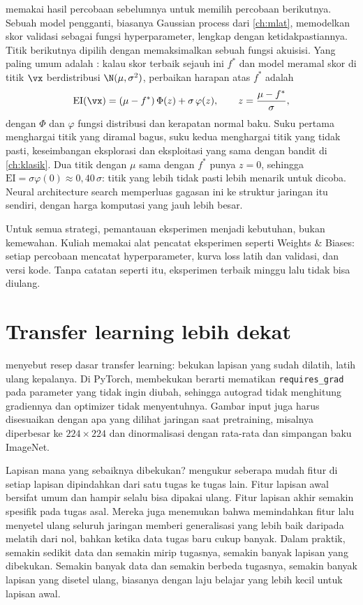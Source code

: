  \citep{snoek2012} memakai hasil percobaan sebelumnya untuk memilih percobaan berikutnya. Sebuah
model pengganti, biasanya Gaussian process dari \cref{ch:mlat}, memodelkan skor validasi sebagai fungsi hyperparameter, lengkap
dengan ketidakpastiannya. Titik berikutnya dipilih dengan memaksimalkan sebuah fungsi akuisisi. Yang paling umum adalah
: kalau skor terbaik sejauh ini $f^*$ dan model meramal skor di titik $\vx$ berdistribusi
$\N(\mu,\sigma^2)$, perbaikan harapan atas $f^*$ adalah
\begin{equation}
\mathrm{EI}(\vx)=(\mu-f^*)\,\Phi(z)+\sigma\,\varphi(z),\qquad z=\frac{\mu-f^*}{\sigma},
\end{equation}
dengan $\Phi$ dan $\varphi$ fungsi distribusi dan kerapatan normal baku. Suku pertama menghargai titik yang diramal bagus,
suku kedua menghargai titik yang tidak pasti, keseimbangan eksplorasi dan eksploitasi yang sama dengan bandit di
\cref{ch:klasik}. Dua titik dengan $\mu$ sama dengan $f^*$ punya $z=0$, sehingga $\mathrm{EI}=\sigma\varphi(0)\approx0{,}40\,\sigma$:
titik yang lebih tidak pasti lebih menarik untuk dicoba. Neural architecture search memperluas gagasan ini ke struktur
jaringan itu sendiri, dengan harga komputasi yang jauh lebih besar.

Untuk semua strategi, pemantauan eksperimen menjadi kebutuhan, bukan kemewahan. Kuliah memakai alat pencatat eksperimen
seperti Weights \& Biases: setiap percobaan mencatat hyperparameter, kurva loss latih dan validasi, dan versi kode. Tanpa catatan
seperti itu, eksperimen terbaik minggu lalu tidak bisa diulang.

\section{Transfer learning lebih dekat}

 menyebut resep dasar transfer learning: bekukan lapisan yang sudah dilatih, latih ulang kepalanya. Di
PyTorch, membekukan berarti mematikan \texttt{requires\_grad} pada parameter yang tidak ingin diubah, sehingga autograd tidak
menghitung gradiennya dan optimizer tidak menyentuhnya. Gambar input juga harus disesuaikan dengan apa yang dilihat jaringan
saat pretraining, misalnya diperbesar ke $224\times224$ dan dinormalisasi dengan rata-rata dan simpangan baku ImageNet.

Lapisan mana yang sebaiknya dibekukan? \citet{yosinski2014} mengukur seberapa mudah fitur di setiap lapisan dipindahkan dari satu
tugas ke tugas lain. Fitur lapisan awal bersifat umum dan hampir selalu bisa dipakai ulang. Fitur lapisan akhir semakin
spesifik pada tugas asal. Mereka juga menemukan bahwa memindahkan fitur lalu menyetel ulang seluruh jaringan memberi
generalisasi yang lebih baik daripada melatih dari nol, bahkan ketika data tugas baru cukup banyak. Dalam praktik, semakin
sedikit data dan semakin mirip tugasnya, semakin banyak lapisan yang dibekukan. Semakin banyak data dan semakin berbeda
tugasnya, semakin banyak lapisan yang disetel ulang, biasanya dengan laju belajar yang lebih kecil untuk lapisan awal.

